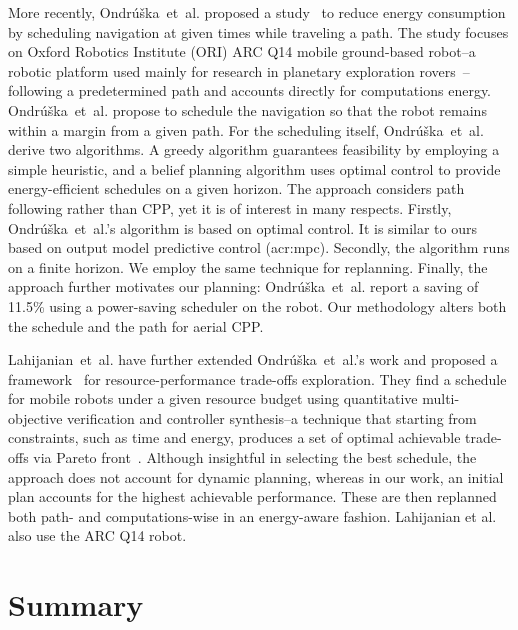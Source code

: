 More recently, Ondr\'{u}\v{s}ka~et~al. proposed a study~\citep{ondruska2015scheduled} to reduce energy consumption by scheduling navigation at given times while traveling a path. The study focuses on Oxford Robotics Institute (ORI) ARC Q14 mobile ground-based robot--a robotic platform used mainly for research in planetary exploration rovers~\citep{yeomans2017murfi}--following a predetermined path and accounts directly for computations energy. Ondr\'{u}\v{s}ka~et~al. propose to schedule the navigation so that the robot remains within a margin from a given path. For the scheduling itself, Ondr\'{u}\v{s}ka~et~al. derive two algorithms. A greedy algorithm guarantees feasibility by employing a simple heuristic, and a belief planning algorithm uses optimal control to provide energy-efficient schedules on a given horizon. The approach considers path following rather than CPP, yet it is of interest in many respects. Firstly, Ondr\'{u}\v{s}ka~et~al.'s algorithm is based on optimal control. It is similar to ours based on output model predictive control (\Gls{acr:mpc}). Secondly, the algorithm runs on a finite horizon. We employ the same technique for replanning. Finally, the approach further motivates our planning: Ondr\'{u}\v{s}ka~et~al. report a saving of 11.5\% using a power-saving scheduler on the robot. Our methodology alters both the schedule and the path for aerial CPP.

Lahijanian~et~al. have further extended Ondr\'{u}\v{s}ka~et~al.'s work and proposed a framework~\citep{lahijanian2018resource} for resource-performance trade-offs exploration. They find a schedule for mobile robots under a given resource budget using quantitative multi-objective verification and controller synthesis--a technique that starting from constraints, such as time and energy, produces a set of optimal achievable trade-offs via Pareto front~\citep{forejt2012pareto}. Although insightful in selecting the best schedule, the approach does not account for dynamic planning, whereas in our work, an initial plan accounts for the highest achievable performance. These are then replanned both path- and computations-wise in an energy-aware fashion. Lahijanian et al. also use the ARC Q14 robot.


\section{\color{red}Summary}

  